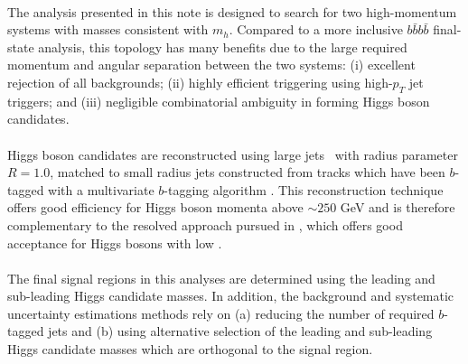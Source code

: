 \paragraph{}
The analysis presented in this note is designed to search for two high-momentum \bbbar systems with masses consistent with $m_{h}$. Compared to a more inclusive $b\bar{b}b\bar{b}$ final-state analysis, this topology has many benefits due to the large required momentum and angular separation between the two \bbbar systems: (i) excellent rejection of all backgrounds; (ii) highly efficient triggering using high-$p_{T}$ jet triggers; and (iii) negligible combinatorial ambiguity in forming Higgs boson candidates.

\paragraph{}
Higgs boson candidates are reconstructed using large \akt jets~\cite{Cacciari:2008gp} with radius parameter $R = 1.0$, matched to small radius jets constructed from tracks which have been $b$-tagged with a multivariate $b$-tagging algorithm \cite{ATL-PHYS-PUB-2015-022}. This reconstruction technique offers good efficiency for Higgs boson momenta above $\sim 250$ GeV and is therefore complementary to the resolved approach pursued in \cite{ResolvedNote}, which offers good acceptance for Higgs bosons with low \pt.


\paragraph{}
The final signal regions in this analyses are determined using the leading and sub-leading Higgs candidate masses. In addition, the background and systematic uncertainty estimations methods rely on (a) reducing the number of required $b$-tagged jets and (b) using alternative selection of the leading and sub-leading Higgs candidate masses which are orthogonal to the signal region. 


